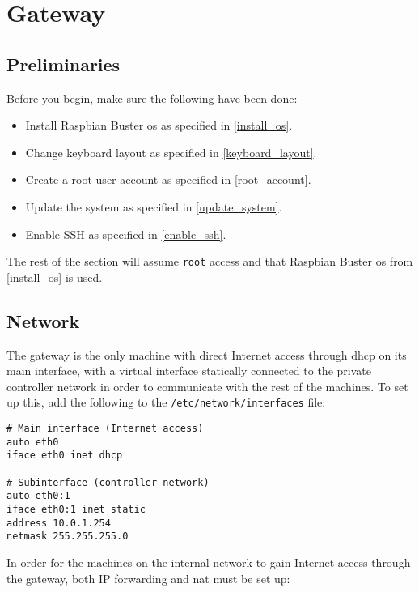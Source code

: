 \chapter{Gateway}


\section{Preliminaries}

Before you begin, make sure the following have been done:

\begin{itemize}
    \item Install Raspbian Buster \gls{os} as specified in \ref{install_os}.
    \item Change keyboard layout as specified in \ref{keyboard_layout}.
    \item Create a root user account as specified in \ref{root_account}.
    \item Update the system as specified in \ref{update_system}.
    \item Enable SSH as specified in \ref{enable_ssh}.
\end{itemize}

The rest of the section will assume \lstinline{root} access and that Raspbian Buster \gls{os} from \ref{install_os} is used.


\section{Network}

The gateway is the only machine with direct Internet access through \gls{dhcp} on its main interface, with a virtual interface statically connected to the private controller network in order to communicate with the rest of the machines. To set up this, add the following to the \lstinline{/etc/network/interfaces} file:

\begin{lstlisting}
# Main interface (Internet access)
auto eth0
iface eth0 inet dhcp

# Subinterface (controller-network)
auto eth0:1
iface eth0:1 inet static
address 10.0.1.254
netmask 255.255.255.0
\end{lstlisting}

In order for the machines on the internal network to gain Internet access through the gateway, both IP forwarding and \gls{nat} must be set up:

